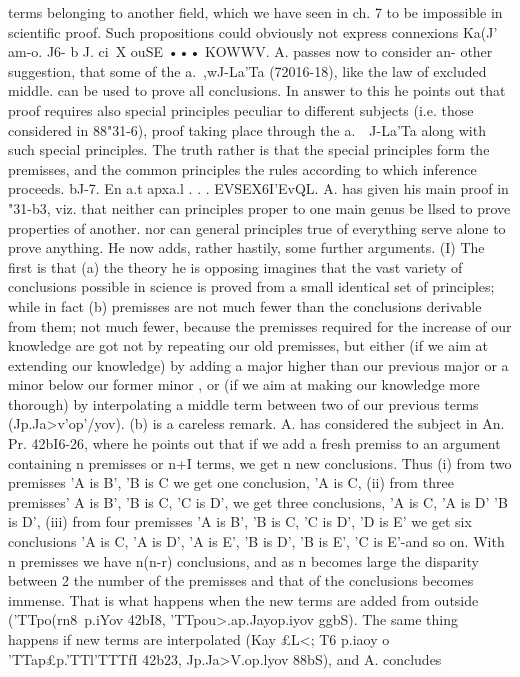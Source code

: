 {{{{{{{{{{{{{{{{{{{{{{{{{{{{{{{{{{{{{{terms belonging to another field, which we have seen in ch. 7 to
be impossible in scientific proof. Such propositions could
obviously not express connexions Ka(J' am-o.
J6- b J. ci~X ouSE ••• KOWWV. A. passes now to consider an-
other suggestion, that some of the a.~,wJ-La'Ta (72016-18), like the
law of excluded middle. can be used to prove all conclusions. In
answer to this he points out that proof requires also special
principles peculiar to different subjects (i.e. those considered in
88"31-6), proof taking place through the a.~~J-La'Ta along with such
special principles. The truth rather is that the special principles
form the premisses, and the common principles the rules according
to which inference proceeds.
bJ-7. En a.t apxa.l . . . EVSEX6I'EvQL. A. has given his main
proof in "31-b3, viz. that neither can principles proper to one main
genus be llsed to prove properties of another. nor can general
principles true of everything serve alone to prove anything. He
now adds, rather hastily, some further arguments. (I) The first
is that (a) the theory he is opposing imagines that the vast
variety of conclusions possible in science is proved from a small
identical set of principles; while in fact (b) premisses are not
much fewer than the conclusions derivable from them; not much
fewer, because the premisses required for the increase of our
knowledge are got not by repeating our old premisses, but either
(if we aim at extending our knowledge) by adding a major higher
than our previous major or a minor below our former minor
, or (if we aim at making our knowledge more thorough) by interpolating a middle term between two of
our previous terms (Jp.{Ja>v'op'/yov).
(b) is a careless remark. A. has considered the subject in An.
Pr. 42bI6-26, where he points out that if we add a fresh premiss
to an argument containing n premisses or n+I terms, we get
n new conclusions. Thus (i) from two premisses 'A is B', 'B is
C we get one conclusion, 'A is C, (ii) from three premisses' A is
B', 'B is C, 'C is D', we get three conclusions, 'A is C, 'A is D'
'B is D', (iii) from four premisses 'A is B', 'B is C, 'C is D',
'D is E' we get six conclusions 'A is C, 'A is D', 'A is E', 'B is
D', 'B is E', 'C is E'-and so on. With n premisses we have
n(n-r) conclusions, and as n becomes large the disparity between
2
the number of the premisses and that of the conclusions becomes
immense. That is what happens when the new terms are added
from outside ('TTpo(rn8~p.iYov 42bI8, 'TTpou>.ap.{Jayop.iyov ggbS). The
same thing happens if new terms are interpolated (Kay £L<; T6
p.iaoy o~ 'TTap£p.'TTl'TTTfI 42b23, Jp.{Ja>V.op.lyov 88bS), and A. concludes
}}}}}}}}}}}}}}}}}}}}}}}}}}}}}}}}}}}}}}}}}
